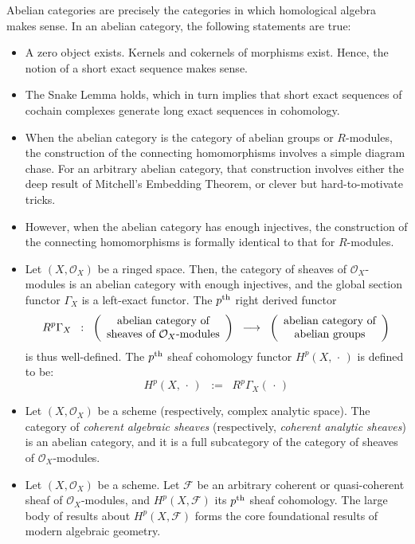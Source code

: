 Abelian categories are precisely the categories in which homological algebra makes sense.
In an abelian category, the following statements are true:
\begin{itemize}
\item
	A zero object exists.
	Kernels and cokernels of morphisms exist.
	Hence, the notion of a short exact sequence makes sense.
\item
	The Snake Lemma holds, which in turn implies that
	short exact sequences of cochain complexes generate long exact sequences in cohomology.
\item
	When the abelian category is the category of abelian groups or $R$-modules,
	the construction of the connecting homomorphisms involves a simple diagram chase.
	For an arbitrary abelian category, that construction involves either the deep result
	of Mitchell's Embedding Theorem, or clever but hard-to-motivate tricks.
\item
	However, when the abelian category has enough injectives,
	the construction of the connecting homomorphisms is formally identical to
	that for $R$-modules. 
\item
	Let $(X,\mathcal{O}_{X})$ be a ringed space.
	Then, the category of sheaves of $\mathcal{O}_{X}$-modules
	is an abelian category with enough injectives, and
	the global section functor $\Gamma_{X}$ is a left-exact functor.
	The $p^{\textnormal{th}}$ right derived functor
	\begin{equation*}
	R^{p}\Gamma_{X}
	\;\; : \;\;
	\left(\begin{array}{c} \textnormal{abelian category of} \\ \textnormal{sheaves of $\mathcal{O}_{X}$-modules} \end{array}\right)
	\;\;\longrightarrow\;\;
	\left(\begin{array}{c} \textnormal{abelian category of} \\ \textnormal{abelian groups} \end{array}\right)
	\end{equation*}
	is thus well-defined.
	The $p^{\textnormal{th}}$ sheaf cohomology functor $H^{p}(X,\,\cdot\,)$ is defined to be:
	\begin{equation*}
	H^{p}(X,\,\cdot\,)
	\;\; := \;\;
		R^{p}\Gamma_{X}(\,\cdot\,)
	\end{equation*}
\item
	Let $(X,\mathcal{O}_{X})$ be a scheme (respectively, complex analytic space).
	The category of \textit{coherent algebraic sheaves} (respectively, \textit{coherent analytic sheaves})
	is an abelian category, and it is a full subcategory of the category of sheaves of $\mathcal{O}_{X}$-modules.
\item
	Let $(X,\mathcal{O}_{X})$ be a scheme.
	Let $\mathcal{F}$ be an arbitrary coherent or quasi-coherent sheaf of $\mathcal{O}_{X}$-modules,
	and $H^{p}(X,\mathcal{F})$ its $p^{\textnormal{th}}$ sheaf cohomology.
	The large body of results about $H^{p}(X,\mathcal{F})$ forms the core foundational results of modern algebraic geometry.
\end{itemize}

